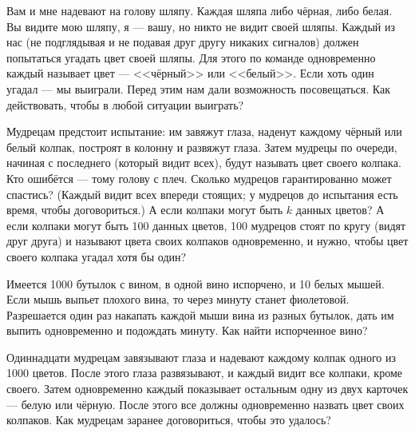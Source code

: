 \documentclass[12pt,a4paper]{article}
\begin{document}
Вам и мне надевают на голову шляпу. Каждая шляпа либо чёрная, либо белая.
Вы видите мою шляпу, я --- вашу, но никто не видит своей шляпы.
Каждый из нас (не подглядывая и не подавая друг другу никаких сигналов) должен попытаться угадать цвет своей шляпы.
Для этого по команде одновременно каждый называет цвет --- <<чёрный>> или <<белый>>.
Если хоть один угадал --- мы выиграли. Перед этим нам дали возможность посовещаться.
Как действовать, чтобы в любой ситуации выиграть?


Мудрецам предстоит испытание: им завяжут глаза, наденут каждому
чёрный или белый колпак, построят в колонну и развяжут глаза.
Затем мудрецы по очереди, начиная с последнего (который видит всех), будут называть
цвет своего колпака. Кто ошибётся --- тому голову с плеч.
Сколько мудрецов гарантированно может спастись?
(Каждый видит всех впереди стоящих; у мудрецов до испытания есть время, чтобы договориться.)
 А если колпаки могут быть $k$ данных цветов?
 А если колпаки могут быть 100 данных цветов,
100 мудрецов стоят по кругу (видят друг друга) и
называют цвета своих колпаков одновременно, и нужно, чтобы цвет своего колпака угадал хотя бы один? %

 Имеется 1000 бутылок с вином, в одной вино испорчено, и 10 белых мышей. Если мышь выпьет плохого вина, то через минуту станет фиолетовой. Разрешается один раз накапать каждой мыши вина из разных бутылок, дать им выпить одновременно и подождать минуту. Как найти испорченное вино?



Одиннадцати мудрецам завязывают глаза и надевают каждому колпак
одного из 1000 цветов. После этого глаза развязывают, и каждый видит все
колпаки, кроме своего. Затем одновременно каждый показывает
остальным одну из двух карточек --- белую или чёрную. После этого
все должны одновременно назвать цвет своих колпаков.
Как мудрецам заранее договориться, чтобы это удалось?


%
\end{document}
